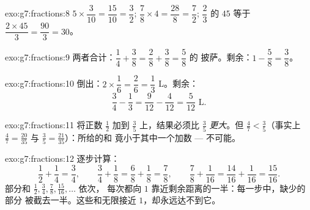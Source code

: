 \begin{solution}{exo:g7:fractions:8}
$5 \times \dfrac{3}{10} = \dfrac{15}{10} = \dfrac32$; \quad
$\dfrac78 \times 4 = \dfrac{28}{8} = \dfrac72$; \quad
$\dfrac23$ 的 $45$ 等于 $\dfrac{2 \times 45}{3} = \dfrac{90}{3} = 30$。
\end{solution}

\begin{solution}{exo:g7:fractions:9}
两者合计：$\dfrac14 + \dfrac38 = \dfrac28 + \dfrac38 = \dfrac58$ 的
披萨。剩余：$1 - \dfrac58 = \dfrac38$。
\end{solution}

\begin{solution}{exo:g7:fractions:10}
倒出：$2 \times \dfrac16 = \dfrac26 = \dfrac13$ L。剩余：
\[
\frac34 - \frac13 = \frac{9}{12} - \frac{4}{12} = \frac{5}{12}
\text{ L}.
\]
\end{solution}

\begin{solution}{exo:g7:fractions:11}
将正数 $\frac12$ 加到 $\frac35$ 上，结果必须比 $\frac35$
\emph{更大}。但 $\frac47 < \frac35$（事实上
$\frac47 = \frac{20}{35}$ 与 $\frac35 = \frac{21}{35}$）：所给的和
竟小于其中一个加数 --- 不可能。
\end{solution}

\begin{solution}{exo:g7:fractions:12}
逐步计算：
\[
\frac12 + \frac14 = \frac34, \qquad
\frac34 + \frac18 = \frac68 + \frac18 = \frac78, \qquad
\frac78 + \frac1{16} = \frac{14}{16} + \frac1{16} = \frac{15}{16}.
\]
部分和 $\frac12, \frac34, \frac78, \frac{15}{16}, \dots$ 依次，
每次都向 $1$ 靠近剩余距离的一半：每一步中，缺少的部分
被截去一半。这些和无限接近 $1$，却永远达不到它。
\end{solution}

